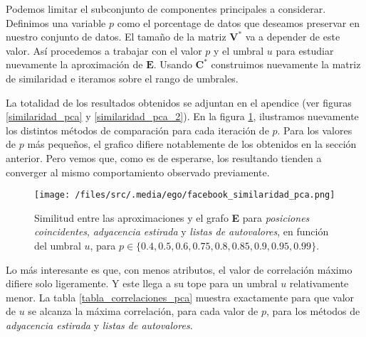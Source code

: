 Podemos limitar el subconjunto de componentes principales a considerar.
Definimos una variable $p$ como el porcentage de datos que deseamos preservar en nuestro conjunto de datos.
El tamaño de la matriz $\textbf{V}^*$ va a depender de este valor.
Así procedemos a trabajar con el valor $p$ y el umbral $u$ para estudiar nuevamente la aproximación de $\textbf{E}$.
Usando $\textbf{C}^*$ construimos nuevamente la matriz de similaridad e iteramos sobre el rango de umbrales.

\vspace{1em}
La totalidad de los resultados obtenidos se adjuntan en el apendice (ver figuras \ref{similaridad_pca} y \ref{similaridad_pca_2}). 
En la figura \ref{grafo_correlaciones_pca}, ilustramos nuevamente los distintos métodos de comparación para cada iteración de $p$.
Para los valores de $p$ más pequeños, el grafico difiere notablemente de los obtenidos en la sección anterior. 
Pero vemos que, como es de esperarse, los resultando tienden a converger al mismo comportamiento observado previamente.

\begin{figure}[!htbp]
    \centering
    \texttt{[image: /files/src/.media/ego/facebook\_similaridad\_pca.png]}
    \caption{Similitud entre las aproximaciones y el grafo \textbf{E} para \textit{posiciones coincidentes}, \textit{adyacencia estirada} y \textit{listas de autovalores}, en función del umbral $u$, para $p \in \{0.4, 0.5, 0.6, 0.75, 0.8, 0.85, 0.9, 0.95, 0.99\}$.}
    \label{grafo_correlaciones_pca}
\end{figure}

\vspace{1em}
Lo más interesante es que, con menos atributos, el valor de correlación máximo difiere solo ligeramente.
Y este llega a su tope para un umbral $u$ relativamente menor.
La tabla \ref{tabla_correlaciones_pca} muestra exactamente para que valor de $u$ se alcanza la máxima correlación, para cada valor de $p$, para los métodos de \textit{adyacencia estirada} y \textit{listas de autovalores}.

